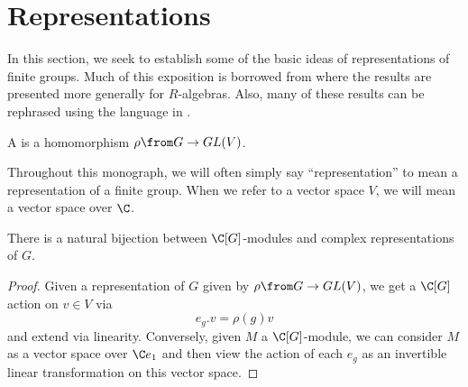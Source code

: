 \documentclass[11pt,leqno,oneside]{amsbook}
\numberwithin{thm}{section}
\begin{document}
\section{Representations}
In this section, we seek to establish some of the basic ideas of
representations of finite groups. Much of this exposition is borrowed
from \cite{etingof} where the results are presented more generally for
\(R\)-algebras. Also, many of these results can be rephrased using the
language in \cite{aw}.
\begin{defn}
  A  is a
  homomorphism \(\rho \from G \to GL(V)\).
\end{defn}
\begin{rmk}
  Throughout this monograph, we will often simply say
  ``representation'' to mean a representation of a finite group. When
  we refer to a vector space \(V\), we will mean a vector space over \(\C\).
\end{rmk}
\begin{thm}
  There is a natural bijection between \(\C[G]\)-modules and complex
  representations of \(G\).
\end{thm}
\begin{proof}
  Given a representation of \(G\) given by \(\rho \from G \to GL(V)\),
  we get a \(\C[G]\) action on \(v \in V\) via \[
    e_g.v = \rho(g)v
  \]
  and extend via linearity. Conversely, given \(M\) a
  \(\C[G]\)-module, we can consider \(M\) as 
  a vector space over \(\C e_1\) and then view the action of each
  \(e_g\) as an invertible linear transformation on this vector space.
\end{proof}
\end{document}
